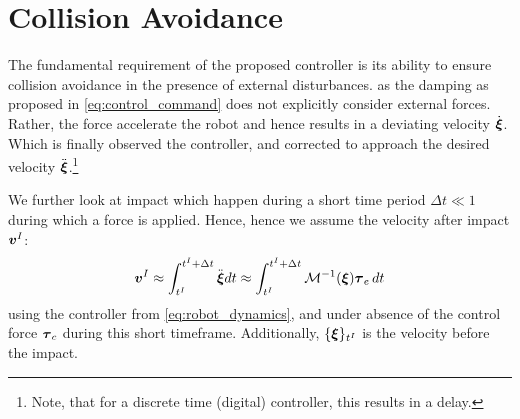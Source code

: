 \section{Collision Avoidance} \label{sec:collision_avoidance}

The fundamental requirement of the proposed controller is its ability to ensure collision avoidance in the presence of external disturbances.
as the damping as proposed in \eqref{eq:control_command} does not explicitly consider external forces. Rather, the force accelerate the robot and hence results in a deviating velocity $\dot{\boldsymbol{\xi}}$. Which is finally observed the controller, and corrected to approach the desired velocity $\ddot{\boldsymbol{\xi}}$.\footnote{Note, that for a discrete time (digital) controller, this results in a delay.}

We further look at impact which happen during a short time period $\Delta t \ll 1$ during which a force is applied. Hence, hence we assume the velocity after impact $\boldsymbol{v}^I$:
\begin{align}
	\vect v^I
	  \approx \int_{t^I}^{t^I + \Delta t} \ddot{\vecs \xi} dt  
	  \approx \int_{t^I}^{t^I + \Delta t} \matd{M}^{-1}(\vecs \xi)  \vecs \tau_e \, dt  
	  \label{eq:impact_velocity}
\end{align}
using the controller from \eqref{eq:robot_dynamics}, and under absence of the control force $\boldsymbol{\tau}_c$ during this short timeframe. Additionally, $\{\boldsymbol{\xi} \}_{t^I}$ is the velocity before the impact.
 

